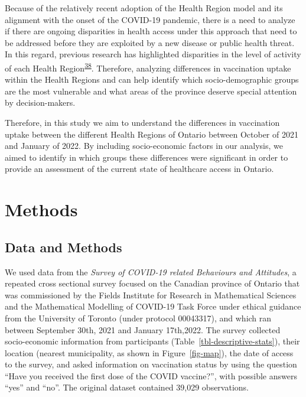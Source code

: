 \documentclass[
]{article}
\begin{document}
Because of the relatively recent adoption of the Health Region model and
its alignment with the onset of the COVID-19 pandemic, there is a need
to analyze if there are ongoing disparities in health access under this
approach that need to be addressed before they are exploited by a new
disease or public health threat. In this regard, previous research has
highlighted disparities in the level of activity of each Health
Region\textsuperscript{\protect\hyperlink{ref-sethuram2023}{38}}.
Therefore, analyzing differences in vaccination uptake within the Health
Regions and can help identify which socio-demographic groups are the
most vulnerable and what areas of the province deserve special attention
by decision-makers.

Therefore, in this study we aim to understand the differences in
vaccination uptake between the different Health Regions of Ontario
between October of 2021 and January of 2022. By including socio-economic
factors in our analysis, we aimed to identify in which groups these
differences were significant in order to provide an assessment of the
current state of healthcare access in Ontario.

\hypertarget{methods}{%
\section{Methods}\label{methods}}

\hypertarget{sec-data}{%
\subsection{Data and Methods}\label{sec-data}}

We used data from the \emph{Survey of COVID-19 related Behaviours and
Attitudes}, a repeated cross sectional survey focused on the Canadian
province of Ontario that was commissioned by the Fields Institute for
Research in Mathematical Sciences and the Mathematical Modelling of
COVID-19 Task Force under ethical guidance from the University of
Toronto (under protocol 00043317), and which ran between September 30th,
2021 and January 17th,2022. The survey collected socio-economic
information from participants (Table~\ref{tbl-descriptive-stats}), their
location (nearest municipality, as shown in Figure~\ref{fig-map}), the
date of access to the survey, and asked information on vaccination
status by using the question ``Have you received the first dose of the
COVID vaccine?'', with possible answers ``yes'' and ``no''. The original
dataset contained 39,029 observations.
\end{document}
